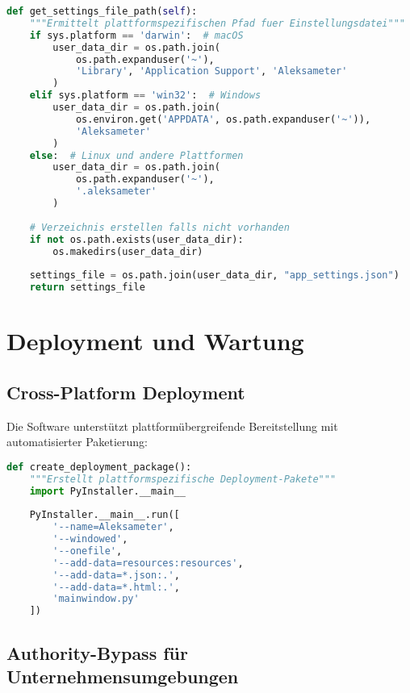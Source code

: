 \begin{lstlisting}[language=Python, caption=Plattformspezifische Pfad-Verwaltung]
def get_settings_file_path(self):
    """Ermittelt plattformspezifischen Pfad fuer Einstellungsdatei"""
    if sys.platform == 'darwin':  # macOS
        user_data_dir = os.path.join(
            os.path.expanduser('~'), 
            'Library', 'Application Support', 'Aleksameter'
        )
    elif sys.platform == 'win32':  # Windows
        user_data_dir = os.path.join(
            os.environ.get('APPDATA', os.path.expanduser('~')), 
            'Aleksameter'
        )
    else:  # Linux und andere Plattformen
        user_data_dir = os.path.join(
            os.path.expanduser('~'), 
            '.aleksameter'
        )
    
    # Verzeichnis erstellen falls nicht vorhanden
    if not os.path.exists(user_data_dir):
        os.makedirs(user_data_dir)
    
    settings_file = os.path.join(user_data_dir, "app_settings.json")
    return settings_file
\end{lstlisting}

\section{Deployment und Wartung}

\subsection{Cross-Platform Deployment}

Die Software unterstützt plattformübergreifende Bereitstellung mit automatisierter Paketierung:

\begin{lstlisting}[language=Python, caption=Deployment-Konfiguration]
def create_deployment_package():
    """Erstellt plattformspezifische Deployment-Pakete"""
    import PyInstaller.__main__
    
    PyInstaller.__main__.run([
        '--name=Aleksameter',
        '--windowed',
        '--onefile',
        '--add-data=resources:resources',
        '--add-data=*.json:.',
        '--add-data=*.html:.',
        'mainwindow.py'
    ])
\end{lstlisting}

\subsection{Authority-Bypass für Unternehmensumgebungen}

